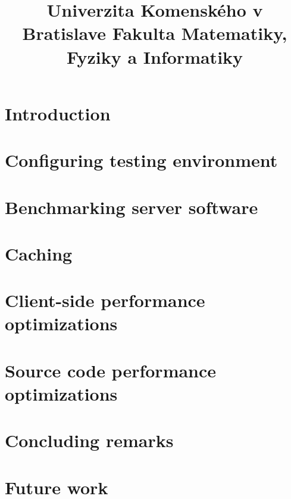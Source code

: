\documentclass[12pt,a4paper]{bachelor}
\title{Univerzita Komenského v Bratislave Fakulta Matematiky, Fyziky a Informatiky}
\author{\autor}
\begin{document}



\printglossaries


\tableofcontents
\listoffigures
\listoftables

\newpage


\chapter{Introduction}


\chapter{Configuring testing environment}


\chapter{Benchmarking server software}


\chapter{Caching}


\chapter{Client-side performance optimizations}


\chapter{Source code performance optimizations}


\chapter{Concluding remarks}


\chapter{Future work}





\label{totalpages}
\end{document}

